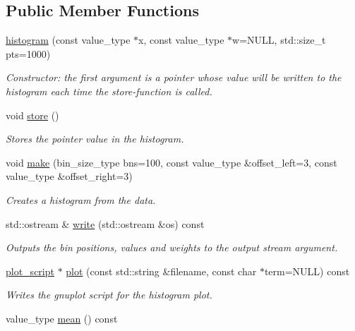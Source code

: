 \subsection*{Public Member Functions}
\begin{DoxyCompactItemize}
\item 
\hyperlink{a00284_ac752e3b23a0235893a23adc3435a8b3b}{histogram} (const value\+\_\+type $\ast$x, const value\+\_\+type $\ast$w=N\+U\+L\+L, std\+::size\+\_\+t pts=1000)
\begin{DoxyCompactList}\small\item\em Constructor\+: the first argument is a pointer whose value will be written to the histogram each time the store-\/function is called. \end{DoxyCompactList}\item 
\hypertarget{a00284_a9b41b5476ebb8bccfabe1ab2b6bb149a}{}void \hyperlink{a00284_a9b41b5476ebb8bccfabe1ab2b6bb149a}{store} ()\label{a00284_a9b41b5476ebb8bccfabe1ab2b6bb149a}

\begin{DoxyCompactList}\small\item\em Stores the pointer value in the histogram. \end{DoxyCompactList}\item 
void \hyperlink{a00284_aafa937e09f5a4886b19825d1c62a6cd9}{make} (bin\+\_\+size\+\_\+type bns=100, const value\+\_\+type \&offset\+\_\+left=3, const value\+\_\+type \&offset\+\_\+right=3)
\begin{DoxyCompactList}\small\item\em Creates a histogram from the data. \end{DoxyCompactList}\item 
std\+::ostream \& \hyperlink{a00284_a373451c0042976a4aa1de0620f249e14}{write} (std\+::ostream \&os) const 
\begin{DoxyCompactList}\small\item\em Outputs the bin positions, values and weights to the output stream argument. \end{DoxyCompactList}\item 
\hypertarget{a00284_a3eabc8668b570eb6126c8e16555f298b}{}\hyperlink{a00431}{plot\+\_\+script} $\ast$ \hyperlink{a00284_a3eabc8668b570eb6126c8e16555f298b}{plot} (const std\+::string \&filename, const char $\ast$term=N\+U\+L\+L) const \label{a00284_a3eabc8668b570eb6126c8e16555f298b}

\begin{DoxyCompactList}\small\item\em Writes the gnuplot script for the histogram plot. \end{DoxyCompactList}\item 
\hypertarget{a00284_a22a3305314453b74248c1ba4050afe0c}{}value\+\_\+type \hyperlink{a00284_a22a3305314453b74248c1ba4050afe0c}{mean} () const \label{a00284_a22a3305314453b74248c1ba4050afe0c}


\end{DoxyCompactItemize}
